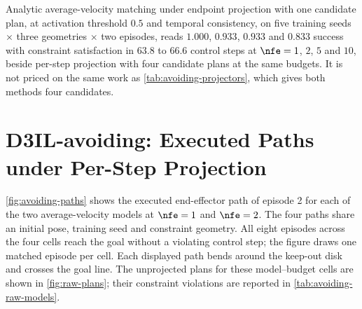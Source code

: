 Analytic average-velocity matching under endpoint projection with one candidate plan, at activation
threshold $0.5$ and temporal consistency, on five training seeds $\times$ three geometries $\times$ two
episodes, reads $1.000$, $0.933$, $0.933$ and $0.833$ success with constraint satisfaction in $63.8$ to
$66.6$ control steps at $\nfe = 1$, $2$, $5$ and $10$, beside per-step projection with four candidate
plans at the same budgets. It is not priced on the same work as \autoref{tab:avoiding-projectors},
which gives both methods four candidates.
\ifappendixfull

\else
\label{tab:app:hf-ladder-detail}
\fi

\FloatBarrier
\section{D3IL-avoiding: Executed Paths under Per-Step Projection}\label{app:avoiding-paths}

\autoref{fig:avoiding-paths} shows the executed end-effector path of episode 2 for each of the two
average-velocity models at $\nfe=1$ and $\nfe=2$. The four paths share an initial pose, training
seed and constraint geometry. All eight episodes across the four cells reach the goal without a
violating control step; the figure draws one matched episode per cell. Each displayed path bends
around the keep-out disk and crosses the goal line. The unprojected plans for these model--budget
cells are shown in \autoref{fig:raw-plans}; their constraint violations are reported in
\autoref{tab:avoiding-raw-models}.

